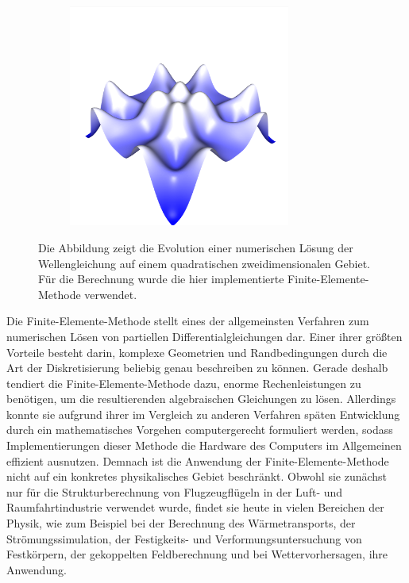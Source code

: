 \documentclass[crop=false]{standalone}
\begin{document}
\begin{figure}[h]
\begin{subfigure}[b]{0.32\textwidth}
        \center
        \includegraphics[trim={0 0 0 2.2cm}, clip, width=0.8\textwidth]{images/intro_06.png}
        \caption{}
      \end{subfigure}
      \caption[%
        Einfache Simulation der Wellengleichung%
      ]{%
        Die Abbildung zeigt die Evolution einer numerischen Lösung der Wellengleichung auf einem quadratischen zweidimensionalen Gebiet.
        Für die Berechnung wurde die hier implementierte Finite-Elemente-Methode verwendet.%
      }
      \label{fig:intro}
    \end{figure}

    Die Finite-Elemente-Methode stellt eines der allgemeinsten Verfahren zum numerischen Lösen von partiellen Differentialgleichungen dar.
    Einer ihrer größten Vorteile besteht darin, komplexe Geometrien und Randbedingungen durch die Art der Diskretisierung beliebig genau beschreiben zu können.
    Gerade deshalb tendiert die Finite-Elemente-Methode dazu, enorme Rechenleistungen zu benötigen, um die resultierenden algebraischen Gleichungen zu lösen.
    Allerdings konnte sie aufgrund ihrer im Vergleich zu anderen Verfahren späten Entwicklung durch ein mathematisches Vorgehen computergerecht formuliert werden, sodass Implementierungen dieser Methode die Hardware des Computers im Allgemeinen effizient ausnutzen.
    Demnach ist die Anwendung der Finite-Elemente-Methode nicht auf ein konkretes physikalisches Gebiet beschränkt.
    Obwohl sie zunächst nur für die Strukturberechnung von Flugzeugflügeln in der Luft- und Raumfahrtindustrie verwendet wurde, findet sie heute in vielen Bereichen der Physik, wie zum Beispiel bei der Berechnung des Wärmetransports, der Strömungssimulation, der Festigkeits- und Verformungsuntersuchung von Festkörpern, der gekoppelten Feldberechnung und bei Wettervorhersagen, ihre Anwendung.
    \cite{Logan2007,Cheney2008,Quarteroni2000}
\end{document}
